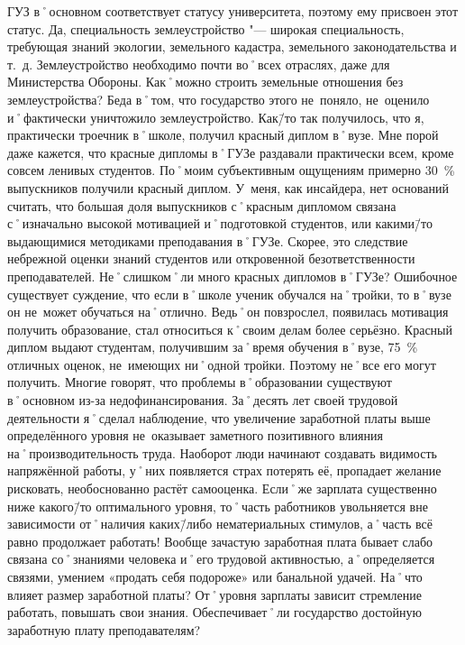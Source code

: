 \begin{drama}
	\michaelspeaks ГУЗ в˚основном соответствует статусу университета, поэтому ему присвоен этот статус. Да, специальность землеустройство "--- широкая специальность, требующая знаний экологии, земельного кадастра, земельного законодательства и т.~д. Землеустройство необходимо почти во˚всех отраслях, даже для Министерства Обороны. Как˚можно строить земельные отношения без землеустройства? Беда в˚том, что государство этого не~поняло, не~оценило и˚фактически уничтожило землеустройство.
	\maxspeaks Как\=/то так получилось, что я, практически троечник в˚школе, получил красный диплом в˚вузе. Мне порой даже кажется, что красные дипломы в˚ГУЗе раздавали практически всем, кроме совсем ленивых студентов. По˚моим субъективным ощущениям примерно 30~\% выпускников получили красный диплом. У~меня, как инсайдера, нет оснований считать, что большая доля выпускников с˚красным дипломом связана с˚изначально высокой мотивацией и˚подготовкой студентов, или какими\=/то выдающимися методиками преподавания в˚ГУЗе. Скорее, это следствие небрежной оценки знаний студентов или откровенной безответственности преподавателей. Не˚слишком˚ли много красных дипломов в˚ГУЗе?
	\michaelspeaks Ошибочное существует суждение, что если в˚школе ученик обучался на˚тройки, то в˚вузе он не~может обучаться на˚отлично. Ведь˚он повзрослел, появилась мотивация получить образование, стал относиться к˚своим делам более серьёзно. Красный диплом выдают студентам, получившим за˚время обучения в˚вузе, 75~\% отличных оценок, не~имеющих ни˚одной тройки. Поэтому не˚все его могут получить.
	\maxspeaks Многие говорят, что проблемы в˚образовании существуют в˚основном из-за недофинансирования. За˚десять лет своей трудовой деятельности я˚сделал наблюдение, что увеличение заработной платы выше определённого уровня не~оказывает заметного позитивного влияния на˚производительность труда. Наоборот люди начинают создавать видимость напряжённой работы, у˚них появляется страх потерять её, пропадает желание рисковать, необоснованно растёт самооценка. Если˚же зарплата существенно ниже какого\=/то оптимального уровня, то˚часть работников увольняется вне зависимости от˚наличия каких\=/либо нематериальных стимулов, а˚часть всё равно продолжает работать! Вообще зачастую заработная плата бывает слабо связана со˚знаниями человека и˚его трудовой активностью, а˚определяется связями, умением  «продать себя подороже» или банальной удачей. На˚что влияет размер заработной платы?
	\michaelspeaks От˚уровня зарплаты зависит стремление работать, повышать свои знания.
	\maxspeaks Обеспечивает˚ли государство достойную заработную плату преподавателям? 

\end{drama}
